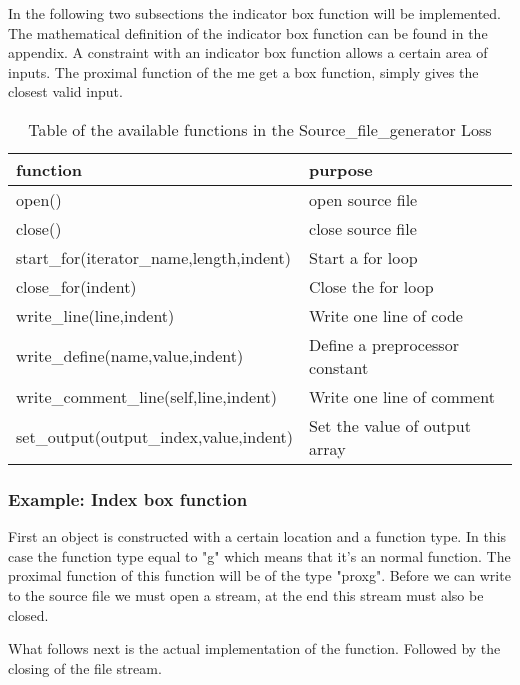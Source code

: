 In the following two subsections the indicator box function will be implemented. The mathematical definition of the indicator box function can be found in the appendix. A constraint with an indicator box function allows a certain area of inputs. The proximal function of the me get a box function, simply gives the closest valid input.

\begin{table}
	\begin{center}
		\begin{tabular}{| l | l | }
			\hline
			function & purpose \\ 
			\hline
			open() & open source file \\
			close() & close source file \\
			start\_for(iterator\_name,length,indent) & Start a for loop \\
			close\_for(indent) & Close the for loop \\
			write\_line(line,indent) & Write one line of code\\
			write\_define(name,value,indent) & Define a preprocessor constant\\
			write\_comment\_line(self,line,indent) & Write one line of comment\\
			set\_output(output\_index,value,indent) & Set the value of output array\\
			\hline
		\end{tabular}
	\end{center}
	\label{tbl:function Source_file_generator}
	\caption{Table of the available functions in the Source\_file\_generator Loss}
\end{table}

\subsubsection{Example: Index box function}
First an object is constructed with a certain location and a function type. In this case the function type equal to "g" which means that it's an normal function. The proximal function of this function will be of the type "proxg". Before we can write to the source file we must open a stream, at the end this stream must also be closed.

What follows next is the actual implementation of the function. Followed by the closing of the file stream.

